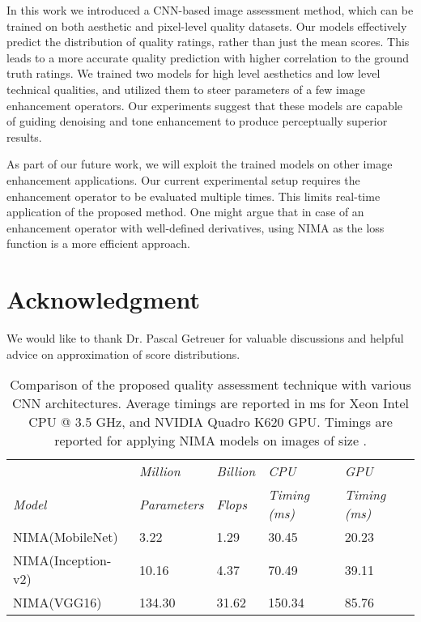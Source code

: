 \documentclass[10pt,twocolumn,twoside]{IEEEtran}
\begin{document}
In this work we introduced a CNN-based image assessment method, which can be trained on both aesthetic and pixel-level quality datasets. Our models effectively predict the distribution of quality ratings, rather than just the mean scores. This leads to a more accurate quality prediction with higher correlation to the ground truth ratings. We trained two models for high level aesthetics and low level technical qualities, and utilized them to steer parameters of a few image enhancement operators. Our experiments suggest that these models are capable of guiding denoising and tone enhancement to produce perceptually superior results. 

As part of our future work, we will exploit the trained models on other image enhancement applications. Our current experimental setup requires the enhancement operator to be evaluated multiple times. This limits real-time application of the proposed method. One might argue that in case of an enhancement operator with well-defined derivatives, using NIMA as the loss function is a more efficient approach.

\section*{Acknowledgment}
We would like to thank Dr. Pascal Getreuer for valuable discussions and helpful advice on approximation of score distributions.

\begin{table*}[!t]
\begin{center}
\captionsetup{width=0.5\textwidth}
\caption{Comparison of the proposed quality assessment technique with various CNN architectures. Average timings are reported in ms for Xeon Intel CPU @ 3.5 GHz, and NVIDIA Quadro K620 GPU. Timings are reported for applying NIMA models on images of size .}
\begin{tabular}{@{} *5l @{}}    \toprule
 & \emph{Million} & \emph{Billion} & \emph{CPU} & \emph{GPU} \\
\emph{Model}  & \emph{Parameters} & \emph{Flops} & \emph{Timing (ms)}  & \emph{Timing (ms)} \\\midrule
NIMA(MobileNet)  & 3.22 & 1.29 &  30.45 &  20.23 \\
NIMA(Inception-v2)  & 10.16 & 4.37 &  70.49 &  39.11 \\
NIMA(VGG16)  & 134.30 & 31.62 &  150.34 &  85.76 \\\bottomrule
 \hline
\end{tabular}
\label{tab:time_comp}
\end{center}
\end{table*}

   
\end{document}
